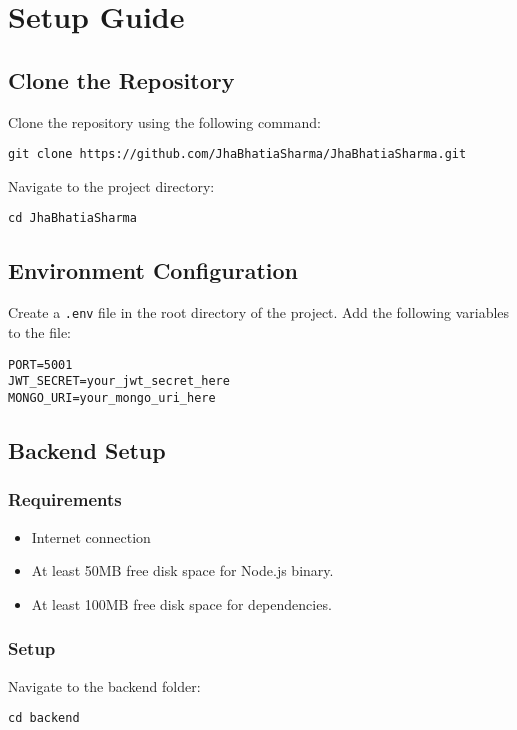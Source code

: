 \section{Setup Guide}

\subsection{Clone the Repository}
Clone the repository using the following command:
\begin{verbatim}
git clone https://github.com/JhaBhatiaSharma/JhaBhatiaSharma.git
\end{verbatim}

Navigate to the project directory:
\begin{verbatim}
cd JhaBhatiaSharma
\end{verbatim}

\subsection{Environment Configuration}
Create a \texttt{.env} file in the root directory of the project.  
Add the following variables to the file:

\begin{verbatim}
PORT=5001
JWT_SECRET=your_jwt_secret_here
MONGO_URI=your_mongo_uri_here
\end{verbatim}

\subsection{Backend Setup}

\subsubsection{Requirements}
\begin{itemize}
    \item Internet connection
    \item At least 50MB free disk space for Node.js binary.
    \item At least 100MB free disk space for dependencies.
\end{itemize}

\subsubsection{Setup}
Navigate to the backend folder:
\begin{verbatim}
cd backend
\end{verbatim}

